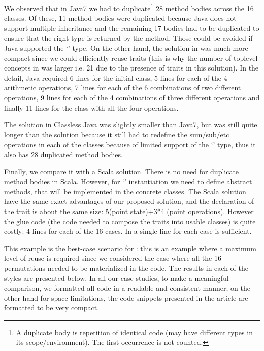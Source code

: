 We observed that in Java7 we had to duplicate\footnote{A duplicate body is repetition of identical code (may have different types in its scope/environment). The first occurrence is not counted. } 28 method bodies across the 16 classes.
Of these, 11 method bodies were duplicated because Java does not support multiple inheritance
 and the remaining 17 bodies had to be duplicated to ensure that the right type
 is returned by the method. Those could be avoided if Java supported
 the `\Q@This@' type.
 On the other hand, the solution in \name was much more compact since we could efficiently
reuse traits (this is why the number of toplevel concepts in \name was larger i.e. 21 due to the
 presence of traits in this solution).
In the detail, Java required 6 lines for the initial \Q@Point@ class,
5 lines for each of the 4 arithmetic operations, 7 lines for each of the 6 combinations
of two different operations, 9 lines for each of the 4 combinations of three different 
operations and finally 11 lines for the class with all the four operations.


 The solution in Classless Java was slightly smaller than Java7,
 but was still quite longer than the \name solution because it still had to redefine the
 sum/sub/etc operations in each of the classes because of limited support of the `\Q@This@' type, thus it also has 28 duplicated method bodies.

Finally, we compare it with a Scala solution.
There is no need for duplicate method bodies in Scala.
However, for `\Q@This@' instantiation we need to define abstract methods, that will be implemented in the concrete classes.
The Scala solution have the same exact advantages
of our proposed solution, and the declaration
of the trait is about the same size: 
5(point state)+3*4 (point operations).
However the glue code (the code needed to compose the traits into usable classes) is quite costly:
4 lines for each of the 16 cases.
In \name a single line for each case is sufficient.

This example is the best-case scenario for \name: this is an example where a maximum level of reuse
 is required since we considered the case where all the 16 permutations needed to be materialized in the code.
The results in each of the styles are presented below.
In all our case studies, to make a meaningful comparison, we formatted all code in a readable and consistent manner;
on the other hand for space limitations, the code snippets presented in the article
are formatted to be very compact.

